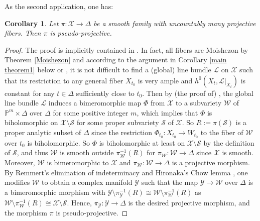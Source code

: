 \documentclass[11pt]{amsart}
\numberwithin{equation}{section}
\theoremstyle{plain}
\newtheorem{cor}[thm]{Corollary}
\theoremstyle{definition}
\newcommand{\cX}{\mathcal X}
\begin{document}
As the second application, one has:
\begin{cor}\label{pp}
Let $\pi: \cX\rightarrow\Delta$ be a smooth family with uncountably many projective fibers.  Then  $\pi$ is pseudo-projective.
\end{cor}
\begin{proof} The proof is implicitly contained in \cite[Lemma 4.25, Remark 4.26]{RT22}. In fact, all fibers are Moishezon by Theorem \ref{Moishezon} and according to the argument in Corollary \ref{main theorem1} below or \cite{RT21,RT22}, it is not difficult to find a (global) line bundle $\mathcal{L}$ on $\mathcal{X}$ such that its restriction to any general fiber $X_{t_0}$ is very ample and $h^{0}(X_t, \mathcal{L}|_{X_t})$ is constant for any $t\in \Delta$ sufficiently close to $t_0$. Then by (the proof of) \cite[Theorem 1.8]{RT22}, the global line bundle $\mathcal{L}$ induces a bimeromorphic map  $\Phi$ from $\mathcal{X}$ to a subvariety  $\mathcal{W}$ of $\mathbb{P}^{m}\times \Delta$ over $\Delta$ for some positive integer $m$, which implies that  $\Phi$ is biholomorphic on $\mathcal{X}\setminus{\mathcal{S}}$ for some proper subvariety $\mathcal{S}$ of $\mathcal{X}$. So $R:=\pi(\mathcal{S})$ is a proper analytic subset of $\Delta$ since the restriction $\Phi_{t_0}:X_{t_0}\rightarrow W_{t_0}$ to the fiber of $\mathcal{W}$ over $t_0$ is biholomorphic.
So $\Phi$ is biholomorphic at least on $\mathcal{X}\setminus{\mathcal{S}}$ by the definition of $\mathcal{S}$, and thus $\mathcal{W}$ is smooth outside ${\pi_{\mathcal{W}}^{-1}(R)}$ for $\pi_{\mathcal{W}}:\mathcal{W}\rightarrow \Delta$ since $\mathcal{X}$ is smooth. Moreover, $\mathcal{W}$ is bimeromorphic to $\mathcal{X}$ and $\pi_{\mathcal{W}}:\mathcal{W}\rightarrow \Delta$ is a projective morphism. By Remmert's elimination of indeterminacy \cite{Re57} and Hironaka's Chow lemma \cite[Corollaries 1 and 2]{Hi75}, one modifies $\mathcal{W}$ to obtain a complex manifold $\mathcal{Y}$ such that the map $\mathcal{Y}\rightarrow {\mathcal{W}}$ over $\Delta$ is a bimeromorphic morphism with $\mathcal{Y}\setminus \pi_{\mathcal{Y}}^{-1}(R)\cong\mathcal{W}\setminus{\pi_{\mathcal{W}}^{-1}(R)}$ as $\mathcal{W}\setminus{\pi_{\mathcal{W}}^{-1}(R)}\cong\mathcal{X}\setminus{\mathcal{S}}$. Hence, $\pi_{\mathcal{Y}}: \mathcal{Y}\rightarrow \Delta$ is the desired projective morphism, and the morphism $\pi$ is pseudo-projective.
\end{proof}
\end{document}
